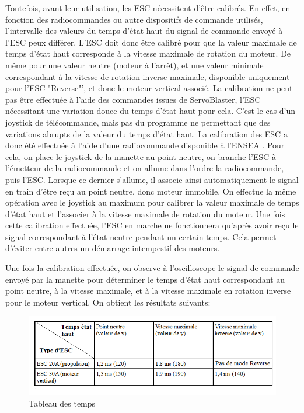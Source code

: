 \documentclass[a4paper,11pt]{report}
\begin{document}
			Toutefois, avant leur utilisation, les ESC nécessitent d'être calibrés. En effet, en fonction des radiocommandes ou autre dispositifs de commande utilisés, l'intervalle des valeurs du temps d'état haut du signal de commande envoyé à l'ESC peux différer. L'ESC doit donc être calibré pour que la valeur maximale de temps d'état haut corresponde à la vitesse maximale de rotation du moteur. De même pour une valeur neutre (moteur à l'arrêt), et une valeur minimale correspondant à la vitesse de rotation inverse maximale, disponible uniquement pour l'ESC "Reverse"', et donc le moteur vertical associé. \newline
			La calibration ne peut pas être effectuée à l'aide des commandes issues de ServoBlaster, l'ESC nécessitant une variation douce du temps d'état haut pour cela. C'est le cas d'un joystick de télécommande, mais pas du programme ne permettant que des variations abrupts de la valeur du temps d'état haut. La calibration des ESC a donc été effectuée à l'aide d'une radiocommande disponible à l'ENSEA \cite{ref9}. Pour cela, on place le joystick de la manette au point neutre, on branche l'ESC à l'émetteur de la radiocommande et on allume dans l'ordre la radiocommande, puis l'ESC. Lorsque ce dernier s'allume, il associe ainsi automatiquement le signal en train d'être reçu au point neutre, donc moteur immobile. On effectue la même opération avec le joystick au maximum pour calibrer la valeur maximale de temps d'état haut et l'associer à la vitesse maximale de rotation du moteur. Une fois cette calibration effectuée, l'ESC en marche ne fonctionnera qu'après avoir reçu le signal correspondant à l'état neutre pendant un certain temps. Cela permet d'éviter entre autres un démarrage intempestif des moteurs. \newline
			
			Une fois la calibration effectuée, on observe à l'oscilloscope le signal de commande envoyé par la manette pour déterminer le temps d'état haut correspondant au point neutre, à la vitesse maximale, et à la vitesse maximale en rotation inverse pour le moteur vertical.
\newline On obtient les résultats suivants:
			
			\begin{figure}[!h]
				  \begin{center}
				  	\includegraphics[scale=0.8]{Photos/tempsesc}
						\caption{Tableau des temps}
				  \end{center}
		  	\end{figure}
				
\end{document}
